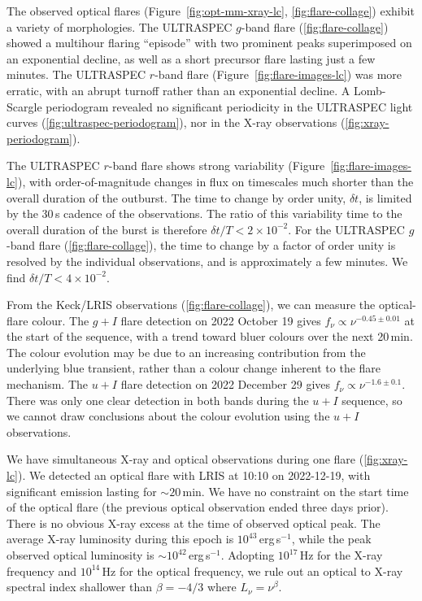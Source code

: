 \documentclass{nature_plusfigure}
\begin{document}
\begin{methods}
The observed optical flares (Figure~\ref{fig:opt-mm-xray-lc}, \ref{fig:flare-collage}) exhibit a variety of morphologies. The ULTRASPEC $g$-band flare (\ref{fig:flare-collage}) showed a multihour flaring ``episode'' with two prominent peaks superimposed on an exponential decline, as well as a short precursor flare lasting just a few minutes. The ULTRASPEC $r$-band flare (Figure~\ref{fig:flare-images-lc}) was more erratic, with an abrupt turnoff rather than an exponential decline. A Lomb-Scargle periodogram\cite{Lomb1976,Scargle1982} revealed no significant periodicity in the ULTRASPEC light curves (\ref{fig:ultraspec-periodogram}), nor in the X-ray observations (\ref{fig:xray-periodogram}). %

The ULTRASPEC $r$-band flare shows strong variability (Figure~\ref{fig:flare-images-lc}), with order-of-magnitude changes in flux on timescales much shorter than the overall duration of the outburst. The time to change by order unity, $\delta t$, is limited by the 30\,s cadence of the observations. The ratio of this variability time to the overall duration of the burst is therefore $\delta t/T<2\times10^{-2}$. For the ULTRASPEC $g$-band flare (\ref{fig:flare-collage}), the time to change by a factor of order unity is resolved by the individual observations, and is approximately a few minutes. We find $\delta t/T<4\times10^{-2}$.

From the Keck/LRIS observations (\ref{fig:flare-collage}), we can measure the optical-flare colour. The $g+I$ flare detection on 2022 October 19 gives $f_\nu \propto \nu^{-0.45\pm0.01}$ at the start of the sequence, with a trend toward bluer colours over the next 20\,min. The colour evolution may be due to an increasing contribution from the underlying blue transient, rather than a colour change inherent to the flare mechanism.
The $u+I$ flare detection on 2022 December 29 gives $f_\nu \propto \nu^{-1.6\pm0.1}$. There was only one clear detection in both bands during the $u+I$ sequence, so we cannot draw conclusions about the colour evolution using the $u+I$ observations. 

We have simultaneous X-ray and optical observations during one flare (\ref{fig:xray-lc}). We detected an optical flare with LRIS at 10:10 on 2022-12-19, with significant emission lasting for $\sim 20$\,min. We have no constraint on the start time of the optical flare (the previous optical observation ended three days prior). There is no obvious X-ray excess at the time of observed optical peak. The average X-ray luminosity during this epoch is $10^{43}\,$erg\,s$^{-1}$, while the peak observed optical luminosity is $\sim 10^{42}$\,erg\,s$^{-1}$.
Adopting $10^{17}\,$Hz for the X-ray frequency and $10^{14}\,$Hz for the optical frequency, we rule out an optical to X-ray spectral index shallower than $\beta=-4/3$ where $L_\nu = \nu^{\beta}$. 


\end{methods}
\end{document}
